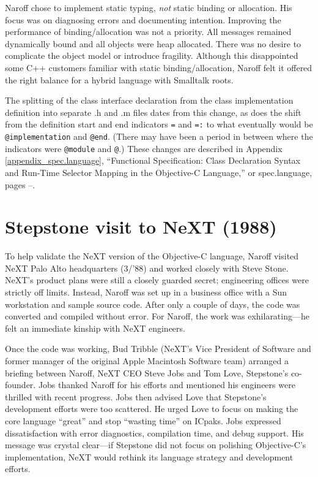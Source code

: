 \documentclass[acmsmall,screen]{acmart}
\begin{document}
Naroff chose to implement static typing, \emph{not} static binding or allocation. His focus was on diagnosing errors and documenting intention. Improving the performance of binding/allocation was not a priority. All messages remained dynamically bound and all objects were heap allocated. There was no desire to complicate the object model or introduce fragility. Although this disappointed some C++ customers familiar with static binding/allocation, Naroff felt it offered the right balance for a hybrid language with Smalltalk roots. 

\addtocounter{appendixpagenumrangestart}{2}
\addtocounter{appendixpagenumrangeend}{5}
The splitting of the class interface declaration from the class implementation definition into separate .h and .m files dates from this change, as does the shift from the definition start and end indicators \verb|=| and \verb|=:| to what eventually would be \verb|@implementation| and \verb|@end|. (There may have been a period in between where the indicators were \verb|@module| and \verb|@|.)
These changes are described in Appendix \ref{appendix_spec.language}, ``Functional Specification: Class Declaration Syntax and Run-Time Selector Mapping in the Objective-C Language,'' or spec.language, pages --.

\section{Stepstone visit to NeXT (1988)}
\label{sec-stepstonetoNeXT1988}
To help validate the NeXT version of the Objective-C language, Naroff visited NeXT Palo Alto headquarters (3/'88) and worked closely with Steve Stone. NeXT's product plans were still a closely guarded secret; engineering offices were strictly off limits. Instead, Naroff was set up in a business office with a Sun workstation and sample source code. After only a couple of days, the code was converted and compiled without error. For Naroff, the work was exhilarating---he felt an immediate kinship with NeXT engineers.

Once the code was working, Bud Tribble (NeXT's Vice President of Software and former manager of the original Apple Macintosh Software team) arranged a briefing between Naroff, NeXT CEO Steve Jobs and Tom Love, Stepstone's co-founder. Jobs thanked Naroff for his efforts and mentioned his engineers were thrilled with recent progress. Jobs then advised Love that Stepstone's development efforts were too scattered. He urged Love to focus on making the core language ``great'' and stop ``wasting time'' on ICpaks. Jobs expressed dissatisfaction with error diagnostics, compilation time, and debug support. His message was crystal clear---if Stepstone did not focus on polishing Objective-C's implementation, NeXT would rethink its language strategy and development efforts.
\end{document}
